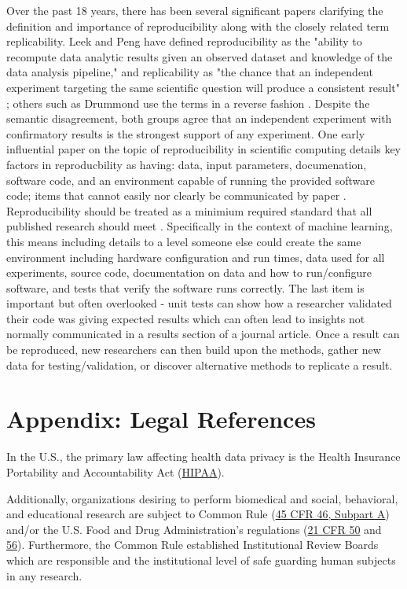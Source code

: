 \documentclass{article}
\begin{document}
 Over the past 18 years, there has been several significant papers clarifying the definition and importance of reproducibility along with the closely related term replicability. Leek and Peng have defined reproducibility as the "ability to recompute data analytic results given an observed dataset and knowledge of the data analysis pipeline," and replicability as "the chance that an independent experiment targeting the same scientific question will produce a consistent result" \cite{leek_opinion_2015}; others such as Drummond use the terms in a reverse fashion \cite{drummond_replicability_2009}. Despite the semantic disagreement, both groups agree that an independent experiment with confirmatory results is the strongest support of any experiment. One early influential paper on the topic of reproducibility in scientific computing details key factors in reproducbility as having: data, input parameters, documenation, software code, and an environment capable of running the provided software code; items that cannot easily nor clearly be communicated by paper \cite{schwab_making_2000}. Reproducibility should be treated as a minimium required standard that all published research should meet \cite{peng_reproducible_2006}. Specifically in the context of machine learning, this means including details to a level someone else could create the same environment including hardware configuration and run times, data used for all experiments, source code, documentation on data and how to run/configure software, and tests that verify the software runs correctly. The last item is important but often overlooked - unit tests can show how a researcher validated their code was giving expected results which can often lead to insights not normally communicated in a results section of a journal article. Once a result can be reproduced, new researchers can then build upon the methods, gather new data for testing/validation, or discover alternative methods to replicate a result.
 

\section{Appendix: Legal References}
In the U.S., the primary law affecting health data privacy is the Health Insurance Portability and Accountability Act (\href{https://www.hhs.gov/hipaa/for-professionals/index.html}{HIPAA}). 


Additionally, organizations desiring to perform biomedical and social, behavioral, and educational research are subject to Common Rule (\href{https://www.hhs.gov/ohrp/regulations-and-policy/regulations/45-cfr-46/index.html#subparta}{45 CFR 46, Subpart A}) and/or the U.S. Food and Drug Administration’s regulations (\href{https://www.ecfr.gov/cgi-bin/text-idx?SID=faa4b2b2900a70fbcac4a773c9da0f0f&mc=true&node=pt21.1.50&rgn=div5}{21 CFR 50} and \href{https://www.ecfr.gov/cgi-bin/text-idx?SID=faa4b2b2900a70fbcac4a773c9da0f0f&mc=true&node=pt21.1.56&rgn=div5}{56}). Furthermore, the Common Rule established Institutional Review Boards which are responsible and the institutional level of safe guarding human subjects in any research. 




\end{document}
